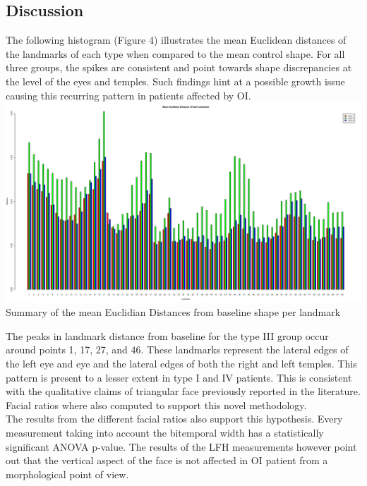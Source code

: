 \documentclass[a0,portrait]{a0poster}
\begin{document}
\begin{multicols}{2}
\section{Discussion}

The following histogram (Figure 4) illustrates the mean Euclidean distances of the
landmarks of each type when compared to the mean control shape.
For all three groups, the spikes are
consistent and point towards shape discrepancies at the level of the eyes and
temples. Such findings hint at a possible growth issue causing this recurring pattern in
patients affected by OI.\\                     

\includegraphics[width=\linewidth]{histo.png}
{\color{Green} Summary of the mean Euclidian Distances from baseline shape per landmark}

The peaks in landmark distance from baseline for the type III group occur
around points 1, 17, 27, and 46. These landmarks represent the lateral edges of
the left eye and eye and the lateral edges of both the right and left temples.
This pattern is present to a lesser extent in type I and IV patients. 
This is consistent with the qualitative claims of triangular face
previously reported in the literature. Facial ratios where also computed to support
this novel methodology.\\
The results from the different facial ratios also support this hypothesis.
Every measurement taking into account the bitemporal width has a statistically significant ANOVA p-value.
The results of the LFH measurements however point out that the vertical aspect of the face
is not affected in OI patient from a morphological point of view.\\


\color{SaddleBrown} %

\end{multicols}
\end{document}
